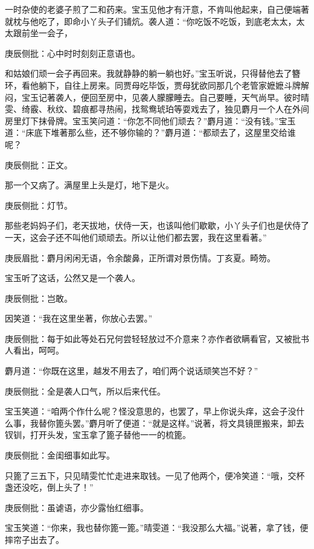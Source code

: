 \begin{parag}
    一时杂使的老婆子煎了二和药来。宝玉见他才有汗意，不肯叫他起来，自己便端著就枕与他吃了，即命小丫头子们铺炕。袭人道：“你吃饭不吃饭，到底老太太，太太跟前坐一会子，\begin{note}庚辰侧批：心中时时刻刻正意语也。\end{note}和姑娘们顽一会子再回来。我就静静的躺一躺也好。”宝玉听说，只得替他去了簪环，看他躺下，自往上房来。同贾母吃毕饭，贾母犹欲同那几个老管家嬷嬷斗牌解闷，宝玉记著袭人，便回至房中，见袭人朦朦睡去。自己要睡，天气尚早。彼时晴雯、绮霰、秋纹、碧痕都寻热闹，找鸳鸯琥珀等耍戏去了，独见麝月一个人在外间房里灯下抹骨牌。宝玉笑问道：“你怎不同他们顽去？”麝月道：“没有钱。”宝玉道：“床底下堆著那么些，还不够你输的？”麝月道：“都顽去了，这屋里交给谁呢？\begin{note}庚辰侧批：正文。\end{note}那一个又病了。满屋里上头是灯，地下是火。\begin{note}庚辰侧批：灯节。\end{note}那些老妈妈子们，老天拔地，伏侍一天，也该叫他们歇歇，小丫头子们也是伏侍了一天，这会子还不叫他们顽顽去。所以让他们都去罢，我在这里看著。”\begin{note}庚辰眉批：麝月闲闲无语，令余酸鼻，正所谓对景伤情。丁亥夏。畸笏。\end{note}
\end{parag}


\begin{parag}
    宝玉听了这话，公然又是一个袭人。\begin{note}庚辰侧批：岂敢。\end{note}因笑道：“我在这里坐著，你放心去罢。”\begin{note}庚辰侧批：每于如此等处石兄何尝轻轻放过不介意来？亦作者欲瞒看官，又被批书人看出，呵呵。\end{note}麝月道：“你既在这里，越发不用去了，咱们两个说话顽笑岂不好？”\begin{note}庚辰侧批：全是袭人口气，所以后来代任。\end{note}宝玉笑道：“咱两个作什么呢？怪没意思的，也罢了，早上你说头痒，这会子没什么事，我替你篦头罢。”麝月听了便道：“就是这样。”说著，将文具镜匣搬来，卸去钗钏，打开头发，宝玉拿了篦子替他一一的梳篦。\begin{note}庚辰侧批：金闺细事如此写。\end{note}只篦了三五下，只见晴雯忙忙走进来取钱。一见了他两个，便冷笑道：“哦，交杯盏还没吃，倒上头了！”\begin{note}庚辰侧批：虽谑语，亦少露怡红细事。\end{note}宝玉笑道：“你来，我也替你篦一篦。”晴雯道：“我没那么大福。”说著，拿了钱，便摔帘子出去了。
\end{parag}


